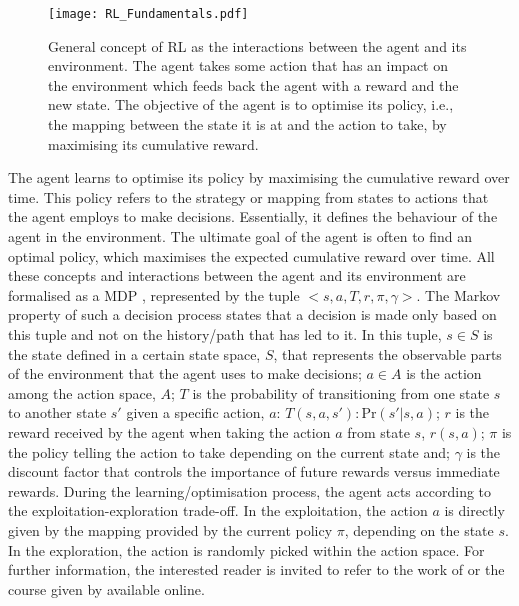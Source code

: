 \documentclass[11pt,twoside,a4paper,english]{article}
\def\ie{i.e., }
\begin{document}
\begin{figure}[!htbp]
\centering
\texttt{[image: RL\_Fundamentals.pdf]}
\caption{General concept of \acrfull{RL} as the interactions between the agent and its environment. The agent takes some action that has an impact on the environment which feeds back the agent with a reward and the new state. The objective of the agent is to optimise its policy, \ie the mapping between the state it is at and the action to take, by maximising its cumulative reward.}
\label{fig:RL_Fundamentals}
\end{figure}

The agent learns to optimise its policy by maximising the cumulative reward over time. This policy refers to the strategy or mapping from states to actions that the agent employs to make decisions. Essentially, it defines the behaviour of the agent in the environment. The ultimate goal of the agent is often to find an optimal policy, which maximises the expected cumulative reward over time.  All these concepts and interactions between the agent and its environment are formalised as a \gls{MDP} \cite{sutton2018reinforcement}, represented by the tuple $<s,a,T,r,\pi,\gamma>$.  The Markov property of such a decision process states that a decision is made only based on this tuple and not on the history/path that has led to it. In this tuple, $s\in S$ is the state defined in a certain state space, $S$, that represents the observable parts of the environment that the agent uses to make decisions; $a\in A$ is the action among the action space, $A$; $T$ is the probability of transitioning from one state $s$ to another state $s'$ given a specific action, $a$: $T(s,a,s'): \text{Pr}\left(s'|s,a\right)$; $r$ is the reward received by the agent when taking the action $a$ from state $s$, $r(s,a)$; $\pi$ is the policy telling the action to take depending on the current state and; $\gamma$ is the discount factor that controls the importance of future rewards versus immediate rewards. During the learning/optimisation process, the agent acts according to the exploitation-exploration trade-off. In the exploitation, the action $a$ is directly given by the mapping provided by the current policy $\pi$,  depending on the state $s$. In the exploration, the action is randomly picked within the action space. For further information, the interested reader is invited to refer to the work of \citet{sutton2018reinforcement} or the course given by \citet{davidsilver_RL_online} available online.
\end{document}
